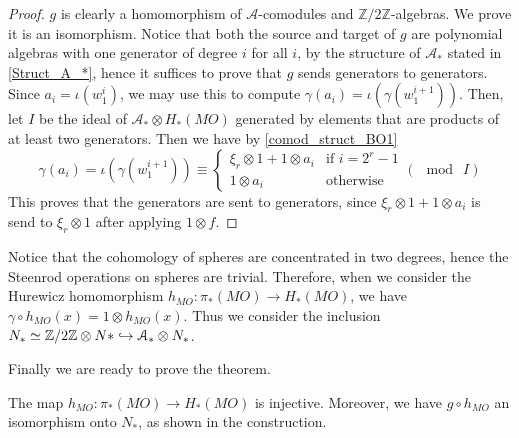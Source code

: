	\begin{proof}
		$g$ is clearly a homomorphism of $\mathcal{A}$-comodules and $\mathbb{Z}/2\mathbb{Z}$-algebras. We prove it is an isomorphism. Notice that both the source and target of $g$ are polynomial algebras with one generator of degree $i$ for all $i$, by the structure of $\mathcal{A}_*$ stated in \cref{Struct_A_*}, hence it suffices to prove that $g$ sends generators to generators. Since $a_i=\iota(w_1^i)$, we may use this to compute $\gamma(a_i)=\iota(\gamma(w_1^{i+1}))$. Then, let $I$ be the ideal of $\mathcal{A}_*\otimes H_*(MO)$ generated by elements that are products of at least two generators. Then we have by \cref{comod_struct_BO1}
		\begin{equation*}
		\gamma(a_i)=\iota(\gamma(w_1^{i+1}))\equiv
		\begin{cases}
			\xi_r\otimes 1+1\otimes a_i & \text{if~}i=2^r-1 \\
			1\otimes a_i & \text{otherwise}
		\end{cases}
		(\mod~I)
		\end{equation*}
		This proves that the generators are sent to generators, since $\xi_r\otimes 1+1\otimes a_i$ is send to $\xi_r\otimes 1$ after applying $1\otimes f$. 
	\end{proof}
	\begin{const}
		Notice that the cohomology of spheres are concentrated in two degrees, hence the Steenrod operations on spheres are trivial. Therefore, when we consider the Hurewicz homomorphism $h_{MO}:\pi_*(MO)\to H_*(MO)$, we have $\gamma\circ h_{MO}(x)=1\otimes h_{MO}(x)$. Thus we consider the inclusion $N_*\simeq\mathbb{Z}/2\mathbb{Z}\otimes N*\hookrightarrow\mathcal{A}_*\otimes N_*$. 
	\end{const}
	Finally we are ready to prove the theorem. 
	\begin{thm}\label{computation_cobordism_ring}
		The map $h_{MO}:\pi_*(MO)\to H_*(MO)$ is injective. Moreover, we have $g\circ h_{MO}$ an isomorphism onto $N_*$, as shown in the construction. 
	\end{thm}
